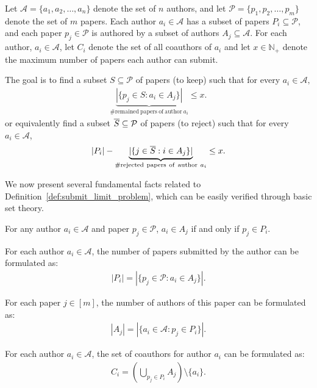 \begin{definition}\label{def:submit_limit_problem}
    Let $\mathcal{A} = \{a_1, a_2, \dots, a_n\}$ denote the set of $n$ authors, and let $\mathcal{P} = \{p_1, p_2, \dots, p_m\}$ denote the set of $m$ papers. Each author $a_i \in \mathcal{A}$ has a subset of papers $P_i \subseteq \mathcal{P}$, and each paper $p_j \in \mathcal{P}$ is authored by a subset of authors $A_j \subseteq \mathcal{A}$. For each author, $a_i \in \mathcal{A}$, let $C_i$ denote the set of all coauthors of $a_i$ and let $x \in \mathbb{N}_+$ denote the maximum number of papers each author can submit. 

    The goal is to find a subset $S \subseteq \mathcal{P}$ of papers (to keep) such that for every $a_i\in\mathcal{A},$
    \begin{align*}
        \underbrace{|\{p_j \in  S : a_i \in A_j\}|}_{\#\mathrm{remained~papers~of~author}~a_i} \leq x.  
    \end{align*}
    or equivalently find a subset $\overline{S} \subseteq \mathcal{P}$ of papers (to reject) such that for every $a_i \in \mathcal{A}$,
        \begin{align*}
        |P_i| - \underbrace{|\{j \in  \overline{S} : i \in A_j\}|}_{\#{\mathrm{rejected~papers~of~author}~}a_i} \leq x.  
    \end{align*}
\end{definition}

We now present several fundamental facts related to Definition~\ref{def:submit_limit_problem}, which can be easily verified through basic set theory. 
\begin{fact}
    For any author $a_i \in \mathcal{A}$ and paper $p_j \in \mathcal{P}$, $a_i \in A_j$ if and only if $p_j \in P_i$.
\end{fact}

\begin{fact}
    For each author $a_i \in \mathcal{A}$, the number of papers submitted by the author can be formulated as:
    \begin{align*}
        |P_i| = |\{p_j \in \mathcal{P} : a_i \in A_j\}|.
    \end{align*}
\end{fact}

\begin{fact}
    For each paper $j \in [m]$, the number of authors of this paper can be formulated as:
    \begin{align*}
        |A_j| = |\{a_i \in \mathcal{A} : p_j \in P_i\}|.
    \end{align*}
\end{fact}

\begin{fact}
    For each author $a_i \in \mathcal{A}$, the set of coauthors for author $a_i$ can be formulated as:
    \begin{align*}
        C_i = (\bigcup_{p_j \in P_i} A_j) \setminus \{ a_i \}.
    \end{align*}
\end{fact}

